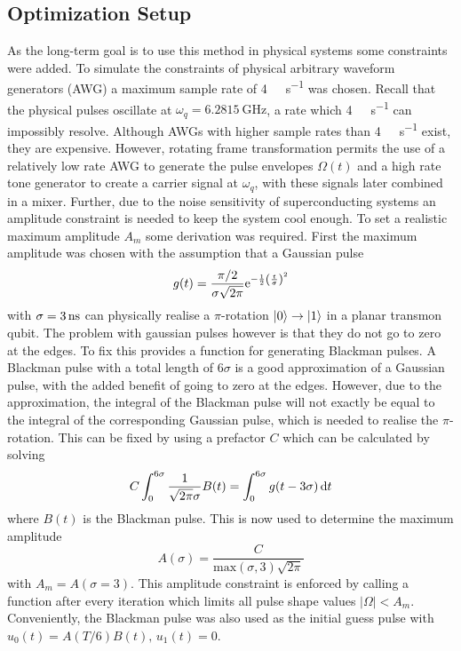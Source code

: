 \documentclass[main.tex]{subfiles}
\begin{document}
\subsection{Optimization Setup}
As the long-term goal is to use this method in physical systems some constraints were added.
To simulate the constraints of physical arbitrary waveform generators (AWG) a maximum sample rate of \SI{4}{\giga\samples\per\second} was chosen.
Recall that the physical pulses oscillate at \( \omega_{q} = \SI{6.2815}{\giga\hertz} \), a rate which \SI{4}{\giga\samples\per\second} can impossibly resolve.
Although AWGs with higher sample rates than \SI{4}{\giga\samples\per\second} exist, they are expensive.
However, rotating frame transformation permits the use of a relatively low rate AWG to generate the pulse envelopes \( \Omega(t) \) and a high rate tone generator to create a carrier signal at \( \omega_{q} \), with these signals later combined in a mixer.
Further, due to the noise sensitivity of superconducting systems an amplitude constraint is needed to keep the system cool enough.
To set a realistic maximum amplitude \( A_m \) some derivation was required.
First the maximum amplitude was chosen with the assumption that a Gaussian pulse
\begin{equation}
    g(t) = \frac{\pi/2}{\sigma\sqrt{2\pi}} \mathrm{e}^{-\frac{1}{2}\qty(\frac{t}{\sigma})^2}
\end{equation}
with \( \sigma = \SI{3}{\nano\second} \) can physically realise a \(\pi\)-rotation \( \ket{0} \rightarrow \ket{1} \) in a planar transmon qubit.
The problem with gaussian pulses however is that they do not go to zero at the edges.
To fix this \krotov{} provides a function for generating Blackman pulses.
A Blackman pulse with a total length of \(6\sigma\) is a good approximation of a Gaussian pulse, with the added benefit of going to zero at the edges.
However, due to the approximation, the integral of the Blackman pulse will not exactly be equal to the integral of the corresponding Gaussian pulse, which is needed to realise the \(\pi\)-rotation.
This can be fixed by using a prefactor \(C\) which can be calculated by solving
\begin{equation}
    C \int_0^{6\sigma}\frac{1}{\sqrt{2\pi}\sigma} B(t) = \int_0^{6\sigma}g(t-3\sigma)\,\mathrm{d} t
\end{equation}
where \(B(t)\) is the Blackman pulse.
This is now used to determine the maximum amplitude
\begin{equation}
    A(\sigma) = \frac{C}{\text{max}(\sigma,3)\sqrt{2\pi}}
\end{equation}
with \(A_m = A(\sigma = 3)\). 
This amplitude constraint is enforced by calling a function after every iteration which limits all pulse shape values \(|\Omega| < A_m\).
Conveniently, the Blackman pulse was also used as the initial guess pulse with \(u_0(t) = A(T/6)B(t),\, u_1(t)=0\).
\end{document}
